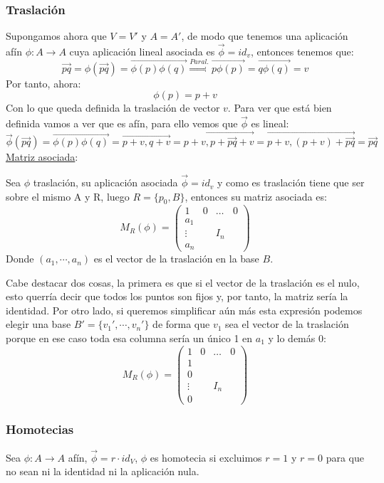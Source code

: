 \documentclass[10pt,a4paper,openright]{book}
\theoremstyle{break}
\begin{document}
\subsubsection*{Traslación}
Supongamos ahora que $V=V'$ y $A=A'$, de modo que tenemos una aplicación afín $\phi: A\rightarrow A$ cuya aplicación lineal asociada es $\vec{\phi} = id_v$, entonces tenemos que:
$$\vec{pq} = \phi(\vec{pq}) = \overrightarrow{\phi(p)\phi(q)}\stackrel{Paral.}{\Rightarrow} \overrightarrow{p\phi(p)} = \overrightarrow{q\phi(q)} = v$$
Por tanto, ahora:
$$\phi(p) = p +v$$
Con lo que queda definida la traslación de vector $v$. Para ver que está bien definida vamos a ver que es afín, para ello vemos que $\vec{\phi}$ es lineal:
$$\vec{\phi}(\vec{pq}) = \overrightarrow{\phi(p)\phi(q)} = \overrightarrow{p+v, q+v} =\overrightarrow{p+v, p+ \vec{pq}+v} = \overrightarrow{p+v, (p+v)+ \vec{pq}} = \vec{pq}$$
\underline{Matriz asociada}:

Sea $\phi$ traslación, su aplicación asociada $\vec{\phi} = id_v$ y como es traslación tiene que ser sobre el mismo A y R, luego $R = \{p_0, B\} $, entonces su matriz asociada es:
$$M_{R} (\phi) = \left(\begin{array}{c|ccc}
1  & 0 & \ldots & 0 \\
\hline
a_1  &  & & \\
\vdots &  & I_n & \\
a_n & & &
\end{array}
\right)$$
Donde $(a_1, \cdots, a_n)$ es el vector de la traslación en la base $B$.

Cabe destacar dos cosas, la primera es que si el vector de la traslación es el nulo, esto querría decir que todos los puntos son fijos y, por tanto, la matriz sería la identidad. Por otro lado, si queremos simplificar aún más esta expresión podemos elegir una base $B'=\{v_1', \cdots, v_n'\}$ de forma que $v_1$ sea el vector de la traslación porque en ese caso toda esa columna sería un único 1 en $a_1$ y lo demás 0:
$$M_{R} (\phi) = \left(\begin{array}{c|ccc}
1  & 0 & \ldots & 0 \\
\hline
1  &  & & \\
0 & & & \\
\vdots &  & I_n & \\
0 & & &
\end{array}
\right)$$

\subsubsection*{Homotecias}
Sea $\phi : A \to A$ afín, $\vec{\phi} = r\cdot id_V$, $\phi$ es homotecia si excluimos $r=1$ y $r=0$ para que no sean ni la identidad ni la aplicación nula.
\end{document}
